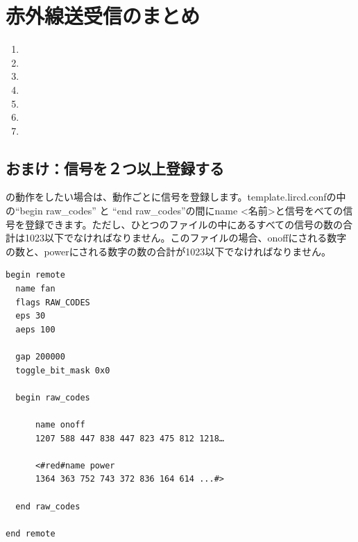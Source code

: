 \documentclass[text05.tex]{subfiles}
\begin{document}
\newpage
\section{赤外線送受信のまとめ}
\begin{enumerate}
\item {}
\item {}
\item {}
\item {}
\item {}
\item {}
\item {}
\end{enumerate}

\begin{tcolorbox}[title=\useOmetoi]
\begin{enumerate}
\end{enumerate}
\end{tcolorbox}

\newpage
\subsection{おまけ：信号を２つ以上登録する}
の動作をしたい場合は、動作ごとに信号を登録します。template.lircd.confの中の“begin raw\_codes” と “end raw\_codes”の間にname <名前>と信号をべての信号を登録できます。ただし、ひとつのファイルの中にあるすべての信号の数の合計は1023以下でなければなりません。このファイルの場合、onoffにされる数字の数と、powerにされる数字の数の合計が1023以下でなければなりません。\\

\begin{lstlisting}[caption=２つの信号を登録するときのtemplate.lircd.conf,label=２つの信号を登録するときのtemplate.lircd.conf]
begin remote
  name fan
  flags RAW_CODES
  eps 30
  aeps 100

  gap 200000
  toggle_bit_mask 0x0

  begin raw_codes

      name onoff
      1207 588 447 838 447 823 475 812 1218…

      <#red#name power
      1364 363 752 743 372 836 164 614 ...#>

  end raw_codes

end remote
\end{lstlisting}
\end{document}
